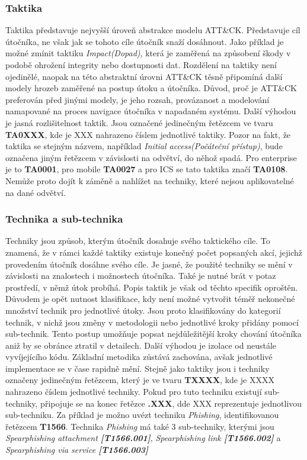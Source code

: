 \subsubsection{Taktika}
Taktika představuje nejvyšší úroveň abstrakce modelu ATT\&CK\@.
Představuje cíl útočníka, ne však jak se tohoto cíle útočník snaží dosáhnout.
Jako příklad je možné zmínit taktiku \textit{Impact(Dopad)}, která je zaměřená na způsobení škody v podobě ohrožení integrity nebo dostupnosti dat.
Rozdělení na taktiky není ojedinělé, naopak na této abstraktní úrovni ATT\&CK těsně připomíná další modely hrozeb zaměřené na postup útoku a útočníka.
Důvod, proč je ATT\&CK preferován před jinými modely, je jeho rozsah, provázanost a modelování namapované na proces navigace útočníka v napadaném systému.
Další výhodou je jasná rozlišitelnost taktik.
Jsou označené jedinečným řetězcem ve tvaru \textbf{TA0XXX}, kde je XXX nahrazeno číslem jednotlivé taktiky.
Pozor na fakt, že taktika se stejným názvem, například \textit{Initial access(Počáteční přístup)}, bude označena jiným řetězcem v závislosti na odvětví, do něhož spadá.
Pro enterprise je to \textbf{TA0001}, pro mobile \textbf{TA0027} a pro ICS se tato taktika značí \textbf{TA0108}.
Nemůže proto dojít k záměně a nahlížet na techniky, které nejsou aplikovatelné na dané odvětví.\cite{Mitre_finding_cyber_threats, mitre_attack_framework}

\subsubsection{Technika a sub-technika}
Techniky jsou způsob, kterým útočník dosahuje svého taktického cíle.
To znamená, že v rámci každé taktiky existuje konečný počet popsaných akcí, jejichž provedením útočník dosáhne svého cíle.
Je jasné, že použité techniky se mění v závislosti na znalostech i možnostech útočníka.
Také je nutné brát v potaz prostředí, v němž útok probíhá.
Popis taktik je však od těchto specifik oproštěn.
Důvodem je opět nutnost klasifikace, kdy není možné vytvořit téměř nekonečné množství technik pro jednotlivé útoky.
Jsou proto klasifikovány do kategorií technik, v nichž jsou změny v metodologii nebo jednotlivé kroky přidány pomocí sub-technik.
Tento postup umožňuje popsat nejdůležitější kroky chování útočníka aniž by se obránce ztratil v detailech.
Další výhodou je izolace od neustále vyvíjejícího kódu.
Základní metodika zůstává zachována, avšak jednotlivé implementace se v čase rapidně mění.
Stejně jako taktiky jsou i techniky označeny jedinečným řetězcem, který je ve tvaru \textbf{TXXXX}, kde je XXXX nahrazeno číslem jednotlivé techniky.
Pokud pro tuto techniku existují sub-techniky, připojuje se na konec řetězce \textbf{.XXX}, dde XXX reprezentuje jednotlivou sub-techniku.
Za příklad je možno uvézt techniku \textit{Phishing}, identifikovanou řetězcem \textbf{T1566}.
Technika \textit{Phishing} má také 3 sub-techniky, kterými jsou \textit{Spearphishing attachment \textbf{[T1566.001]}}, \textit{Spearphishing link \textbf{[T1566.002]}} a \textit{Spearphishing via service \textbf{[T1566.003]}}

